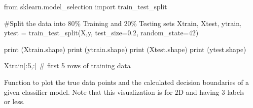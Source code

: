 \documentclass[
  letterpaper,
  DIV=11,
  numbers=noendperiod]{scrartcl}
\newenvironment{Shaded}{\begin{snugshade}}{\end{snugshade}}
\newcommand{\BuiltInTok}[1]{\textcolor[rgb]{0.00,0.23,0.31}{#1}}
\newcommand{\CommentTok}[1]{\textcolor[rgb]{0.37,0.37,0.37}{#1}}
\newcommand{\DecValTok}[1]{\textcolor[rgb]{0.68,0.00,0.00}{#1}}
\newcommand{\FloatTok}[1]{\textcolor[rgb]{0.68,0.00,0.00}{#1}}
\newcommand{\ImportTok}[1]{\textcolor[rgb]{0.00,0.46,0.62}{#1}}
\newcommand{\NormalTok}[1]{\textcolor[rgb]{0.00,0.23,0.31}{#1}}
\newcommand{\OperatorTok}[1]{\textcolor[rgb]{0.37,0.37,0.37}{#1}}
\begin{document}
\begin{Shaded}
\begin{Highlighting}[]
\ImportTok{from}\NormalTok{ sklearn.model\_selection }\ImportTok{import}\NormalTok{ train\_test\_split}

\CommentTok{\#Split the data into 80\% Training and 20\% Testing sets}
\NormalTok{Xtrain, Xtest, ytrain, ytest }\OperatorTok{=}\NormalTok{ train\_test\_split(X,y, test\_size}\OperatorTok{=}\FloatTok{0.2}\NormalTok{, random\_state}\OperatorTok{=}\DecValTok{42}\NormalTok{)}

\BuiltInTok{print}\NormalTok{ (Xtrain.shape)}
\BuiltInTok{print}\NormalTok{ (ytrain.shape)}
\BuiltInTok{print}\NormalTok{ (Xtest.shape)}
\BuiltInTok{print}\NormalTok{ (ytest.shape)}

\NormalTok{Xtrain[:}\DecValTok{5}\NormalTok{,:] }\CommentTok{\# first 5 rows of training data}
\end{Highlighting}
\end{Shaded}

Function to plot the true data points and the calculated decision
boundaries of a given classifier model. Note that this visualization is
for 2D and having 3 labels or less.
\end{document}

